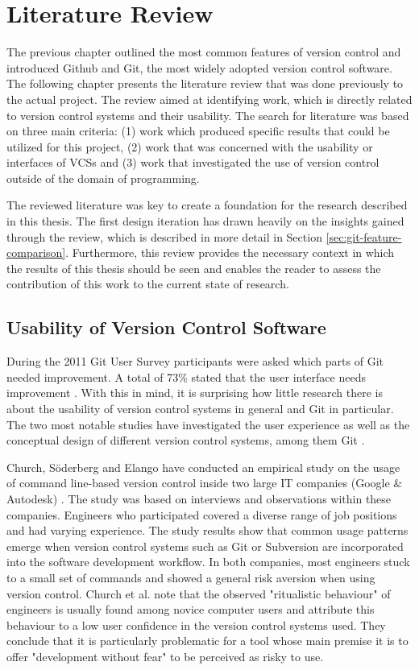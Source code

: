 \chapter{Literature Review} \label{chapter:related-work}
The previous chapter outlined the most common features of version control and introduced Github and Git, the most widely adopted version control software. The following chapter presents the literature review that was done previously to the actual project. The review aimed at identifying work, which is directly related to version control systems and their usability. The search for literature was based on three main criteria: (1) work which produced specific results that could be utilized for this project, (2) work that was concerned with the usability or interfaces of VCSs and (3) work that investigated the use of version control outside of the domain of programming.

The reviewed literature was key to create a foundation for the research described in this thesis. The first design iteration has drawn heavily on the insights gained through the review, which is described in more detail in Section \ref{sec:git-feature-comparison}. Furthermore, this review provides the necessary context in which the results of this thesis should be seen and enables the reader to assess the contribution of this work to the current state of research.

\section{Usability of Version Control Software}
During the 2011 Git User Survey participants were asked which parts of Git needed improvement. A total of 73\% stated that  the user interface needs improvement \cite{_git_2011}. With this in mind, it is surprising how little research there is about the usability of version control systems in general and Git in particular. The two most notable studies have investigated the user experience as well as the conceptual design of different version control systems, among them Git \cite{church_case_2014,perez_de_rosso_whats_2013}.

Church, Söderberg and Elango have conducted an empirical study on the usage of command line-based version control inside two large IT companies (Google \& Autodesk) \cite{church_case_2014}. The study was based on interviews and observations within these companies. Engineers who participated covered a diverse range of job positions and had varying experience. The study results show that common usage patterns emerge when version control systems such as Git or Subversion are incorporated into the software development workflow. In both companies, most engineers stuck to a small set of commands and showed a general risk aversion when using version control. Church et al. note that the observed "ritualistic behaviour" of engineers is usually found among novice computer users and attribute this behaviour to a low user confidence in the version control systems used. They conclude that it is particularly problematic for a tool whose main premise it is to offer "development without fear" to be perceived as risky to use.

